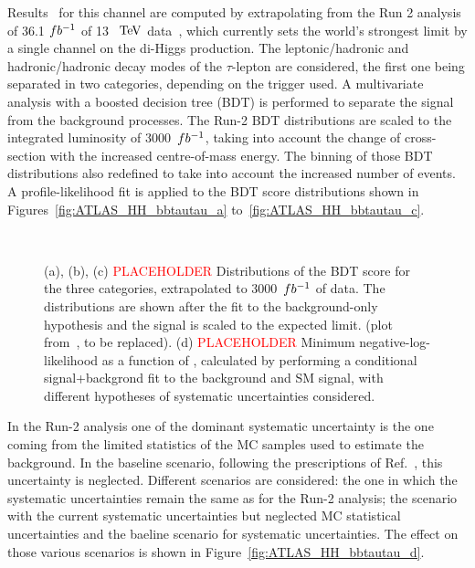 Results~\cite{ATLASHHPUBnote} for this channel are computed by extrapolating from the Run 2 analysis of 36.1 $fb^{-1}$ of 13~$~\text{TeV}$ data~\cite{ATLASrun2HHbbtautau}, which currently sets the world's strongest limit by a single channel on the di-Higgs production. 
The leptonic/hadronic and hadronic/hadronic decay modes of the $\tau$-lepton are considered, the first one being separated in two categories, depending on the trigger used. A multivariate analysis with a boosted decision tree (BDT) is performed to separate the signal from the background processes. The Run-2 BDT distributions are scaled to the integrated luminosity of 3000~$fb^{-1}$, taking into account the change of cross-section with the increased centre-of-mass energy. The binning of those BDT distributions also redefined to take into account the increased number of events.
A profile-likelihood fit is applied to the BDT score distributions shown in Figures~\ref{fig:ATLAS_HH_bbtautau_a} to~\ref{fig:ATLAS_HH_bbtautau_c}. 


\begin{figure}[!htb]
\centering 
{} 
\\
\caption{(a), (b), (c) \textcolor{red}{PLACEHOLDER} Distributions of the BDT score for the three categories, extrapolated to 3000~$fb^{-1}$ of data. The distributions are shown after the fit to the background-only hypothesis and the signal is scaled to the expected limit.  (plot from~\cite{ATLASrun2HHbbtautau}, to be replaced). (d) \textcolor{red}{PLACEHOLDER} Minimum negative-log-likelihood as a function of \kl, calculated by performing a conditional signal+backgrond fit to the background and SM signal, with different hypotheses of systematic uncertainties considered.} 
\label{fig:ATLAS_HH_bbtautau} 
\end{figure}

In the Run-2 analysis one of the dominant systematic uncertainty is the one coming from the limited statistics of the MC samples used to estimate the background. In the baseline scenario, following the prescriptions of Ref.~\cite{ATLASperformance}, this uncertainty is neglected.
Different scenarios are considered: the one in which the systematic uncertainties remain the same as for the Run-2 analysis; the scenario with the current systematic uncertainties but neglected MC statistical uncertainties and the baeline scenario for systematic uncertainties. The effect on those various scenarios is shown in Figure~\ref{fig:ATLAS_HH_bbtautau_d}.

